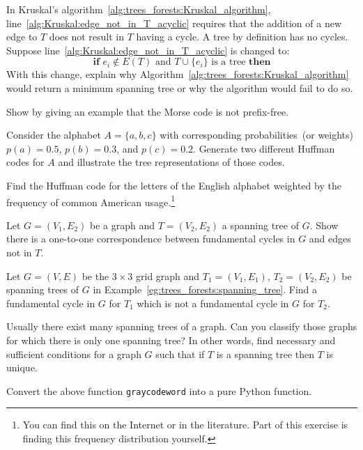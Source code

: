 \begin{problem}
\item In Kruskal's
  algorithm~\ref{alg:trees_forests:Kruskal_algorithm},
  line~\ref{alg:Kruskal:edge_not_in_T_acyclic} requires that the
  addition of a new edge to $T$ does not result in $T$ having a
  cycle. A tree by definition has no cycles. Suppose
  line~\ref{alg:Kruskal:edge_not_in_T_acyclic} is changed to:
  \[
  \textbf{if } e_i \notin E(T)
  \text{ and }
  T \cup \{e_i\} \text{ is a tree } \textbf{then}
  \]
  With this change, explain why
  Algorithm~\ref{alg:trees_forests:Kruskal_algorithm} would return a
  minimum spanning tree or why the algorithm would fail to do so.

\item Show by giving an example that the Morse code is not
  prefix-free.

\item Consider the alphabet $A = \{a,b,c\}$ with corresponding
  probabilities~(or weights) $p(a) = 0.5$, $p(b) = 0.3$, and
  $p(c) = 0.2$. Generate two different Huffman codes for $A$ and
  illustrate the tree representations of those codes.

\item Find the Huffman code for the letters of the English alphabet
  weighted by the frequency of common American usage.\footnote{
    You can find this on the Internet or in the literature. Part of
    this exercise is finding this frequency distribution yourself.}

\item Let $G=(V_1,E_2)$ be a graph and $T=(V_2,E_2)$ a spanning tree
  of $G$. Show there is a one-to-one correspondence between
  fundamental cycles in $G$ and edges not in $T$.

\item Let $G=(V, E)$ be the $3\times 3$ grid graph and $T_1=(V_1,E_1)$,
  $T_2=(V_2,E_2)$ be spanning trees of $G$ in
  Example~\ref{eg:trees_forests:spanning_tree}. Find a fundamental
  cycle in $G$ for $T_1$ which is not a fundamental cycle in $G$ for
  $T_2$.

\item Usually there exist many spanning trees of a graph. Can you
  classify those graphs for which there is only one spanning tree? In
  other words, find necessary and sufficient conditions for a graph
  $G$ such that if $T$ is a spanning tree then $T$ is unique.

\item Convert the above function {\tt graycodeword} into a pure Python
  function.


\end{problem}
